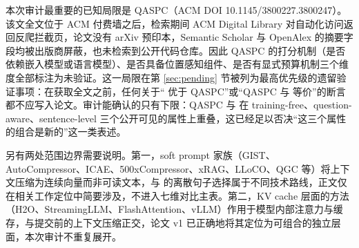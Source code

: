 本次审计最重要的已知局限是 QASPC（ACM DOI 10.1145/3800227.3800247）。该文全文位于 ACM 付费墙之后，检索期间 ACM Digital Library 对自动化访问返回反爬拦截页，论文没有 arXiv 预印本，Semantic Scholar 与 OpenAlex 的摘要字段均被出版商屏蔽，也未检索到公开代码仓库。因此 QASPC 的打分机制（是否依赖嵌入模型或语言模型）、是否具备位置感知组件、是否有显式预算机制三个维度全部标注为未验证。这一局限在第 \ref{sec:pending} 节被列为最高优先级的遗留验证事项：在获取全文之前，任何关于``\sieve{} 优于 QASPC''或``QASPC 与 \sieve{} 等价''的断言都不应写入论文。审计能确认的只有下限：QASPC 与 \sieve{} 在 training-free、question-aware、sentence-level 三个公开可见的属性上重叠，这已经足以否决``这三个属性的组合是新的''这一类表述。

另有两处范围边界需要说明。第一，soft prompt 家族（GIST、AutoCompressor、ICAE、500xCompressor、xRAG、LLoCO、QGC 等）将上下文压缩为连续向量而非可读文本，与 \sieve{} 的离散句子选择属于不同技术路线，正文仅在相关工作定位中简要涉及，不进入七维对比主表。第二，KV cache 层面的方法（H2O、StreamingLLM、FlashAttention、vLLM）作用于模型内部注意力与缓存，与提交前的上下文压缩正交，论文 v1 已正确地将其定位为可组合的独立层面，本次审计不重复展开。

